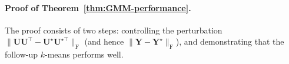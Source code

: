 \paragraph{Proof of Theorem~\ref{thm:GMM-performance}.}
The proof consists of two steps: controlling the perturbation $\|\bm{U}\bm{U}^{\top}-\bm{U}^{\star}\bm{U}^{\star\top}\|_{\mathrm{F}}$ (and hence $\|\bm{Y}-\bm{Y}^{\star}\|_{\mathrm{F}}$),
and demonstrating that the follow-up $k$-means  performs well.



